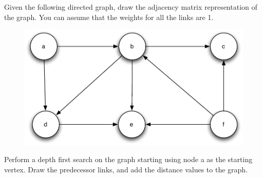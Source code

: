 \documentclass[11pt]{exam}
\begin{document}
\begin{questions}
\newpage

\newpage

\question[10] Given the following directed graph, draw the adjacency matrix representation of the graph.  You can assume that the weights for all the links are 1.
\begin{figure}[h!t]
        \begin{center}
        \includegraphics[scale=.75]{dfs}
    \end{center}
\end{figure}


\question[10] Perform a depth first search on the graph starting using node a as the starting vertex.  Draw the predecessor links, and add the distance values to the graph.

\end{questions}
\end{document}
